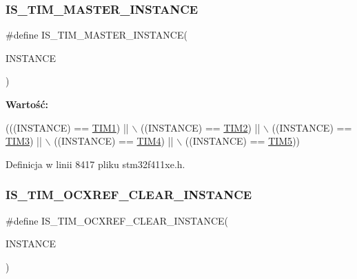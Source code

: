 \subsubsection{\texorpdfstring{I\+S\+\_\+\+T\+I\+M\+\_\+\+M\+A\+S\+T\+E\+R\+\_\+\+I\+N\+S\+T\+A\+N\+CE}{IS\_TIM\_MASTER\_INSTANCE}}
{\footnotesize\ttfamily \#define I\+S\+\_\+\+T\+I\+M\+\_\+\+M\+A\+S\+T\+E\+R\+\_\+\+I\+N\+S\+T\+A\+N\+CE(\begin{DoxyParamCaption}\item[{}]{I\+N\+S\+T\+A\+N\+CE }\end{DoxyParamCaption})}

{\bfseries Wartość\+:}
\begin{DoxyCode}
(((INSTANCE) == \hyperlink{group___peripheral__declaration_ga2e87451fea8dc9380056d3cfc5ed81fb}{TIM1}) || \(\backslash\)
                                          ((INSTANCE) == \hyperlink{group___peripheral__declaration_ga3cfac9f2e43673f790f8668d48b4b92b}{TIM2}) || \(\backslash\)
                                          ((INSTANCE) == \hyperlink{group___peripheral__declaration_ga61ee4c391385607d7af432b63905fcc9}{TIM3}) || \(\backslash\)
                                          ((INSTANCE) == \hyperlink{group___peripheral__declaration_ga91a09bad8bdc7a1cb3d85cf49c94c8ec}{TIM4}) || \(\backslash\)
                                          ((INSTANCE) == \hyperlink{group___peripheral__declaration_ga5125ff6a23a2ed66e2e19bd196128c14}{TIM5}))
\end{DoxyCode}


Definicja w linii 8417 pliku stm32f411xe.\+h.

\mbox{\label{group___exported__macros_ga7bf2abf939c55a4c8284c184735accdc}} 
\subsubsection{\texorpdfstring{I\+S\+\_\+\+T\+I\+M\+\_\+\+O\+C\+X\+R\+E\+F\+\_\+\+C\+L\+E\+A\+R\+\_\+\+I\+N\+S\+T\+A\+N\+CE}{IS\_TIM\_OCXREF\_CLEAR\_INSTANCE}}
{\footnotesize\ttfamily \#define I\+S\+\_\+\+T\+I\+M\+\_\+\+O\+C\+X\+R\+E\+F\+\_\+\+C\+L\+E\+A\+R\+\_\+\+I\+N\+S\+T\+A\+N\+CE(\begin{DoxyParamCaption}\item[{}]{I\+N\+S\+T\+A\+N\+CE }\end{DoxyParamCaption})}

